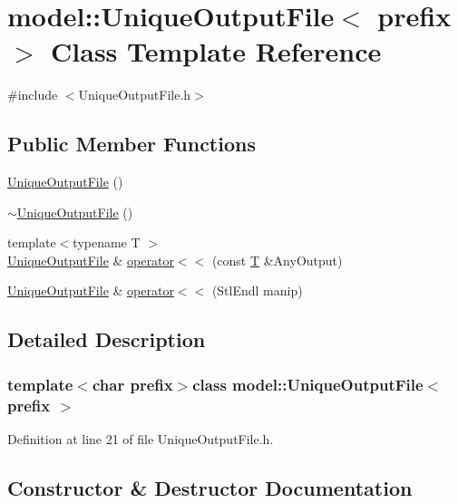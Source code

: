 \hypertarget{classmodel_1_1_unique_output_file}{}\section{model\+:\+:Unique\+Output\+File$<$ prefix $>$ Class Template Reference}
\label{classmodel_1_1_unique_output_file}


{\ttfamily \#include $<$Unique\+Output\+File.\+h$>$}

\subsection*{Public Member Functions}
\begin{DoxyCompactItemize}
\item 
\hyperlink{classmodel_1_1_unique_output_file_abb5ed480634c18b8bf0e1a926d9f844a}{Unique\+Output\+File} ()
\item 
\hyperlink{classmodel_1_1_unique_output_file_ae61b1b261256ffe5a8dc708df1c41223}{$\sim$\+Unique\+Output\+File} ()
\item 
{\footnotesize template$<$typename T $>$ }\\\hyperlink{classmodel_1_1_unique_output_file}{Unique\+Output\+File} \& \hyperlink{classmodel_1_1_unique_output_file_a211ce51b3dd2d73023b6461e854c84fe}{operator$<$$<$} (const \hyperlink{_spline_node_base__corder1_8h_a82692d3a5502b91460591f1d5504314a}{T} \&Any\+Output)
\item 
\hyperlink{classmodel_1_1_unique_output_file}{Unique\+Output\+File} \& \hyperlink{classmodel_1_1_unique_output_file_ab632a3690fbc5f0ee2051dae6aa78e07}{operator$<$$<$} (Stl\+Endl manip)
\end{DoxyCompactItemize}


\subsection{Detailed Description}
\subsubsection*{template$<$char prefix$>$class model\+::\+Unique\+Output\+File$<$ prefix $>$}



Definition at line 21 of file Unique\+Output\+File.\+h.



\subsection{Constructor \& Destructor Documentation}
\hypertarget{classmodel_1_1_unique_output_file_abb5ed480634c18b8bf0e1a926d9f844a}{}
